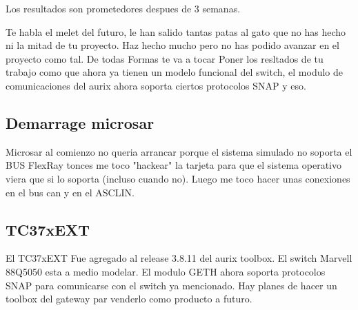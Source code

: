 Los resultados son prometedores despues de 3 semanas.

Te habla el melet del futuro, le han salido tantas patas al gato que no has hecho ni la mitad de tu proyecto. Haz hecho mucho pero no has podido avanzar en el proyecto como tal. De todas Formas te va a tocar Poner los resltados de tu trabajo como que ahora ya tienen un modelo funcional del switch, el modulo de comunicaciones del aurix ahora soporta ciertos protocolos SNAP y eso.

\subsection{Demarrage microsar}
Microsar al comienzo no queria arrancar porque el sistema simulado no soporta el BUS FlexRay tonces me toco "hackear" la tarjeta para que el sistema operativo viera que si lo soporta (incluso cuando no). Luego me toco hacer unas conexiones en el bus can y en el ASCLIN. 

\subsection{TC37xEXT}
El TC37xEXT Fue agregado al release 3.8.11 del aurix toolbox.
El switch Marvell 88Q5050 esta a medio modelar.
El modulo GETH ahora soporta protocolos SNAP para comunicarse con el switch ya mencionado. Hay planes de hacer un toolbox del gateway par venderlo como producto a futuro.